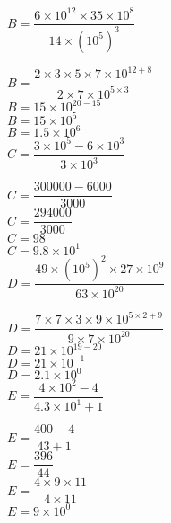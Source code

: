     \begin{spacing}{2}
        \begin{itemize}
            \def\item{}
            \item $B=\dfrac{6\times 10^{12}\times 35 \times 10^8}{14\times \left(10^5\right)^3}$

            {\red
                $B=\dfrac{2\times 3\times 5\times 7\times 10^{12+8}}{2\times 7\times 10^{5\times 3}}$\\
                $B=15\times 10^{20-15}$\\
                $B=15\times 10^{5}$\\
                $B=\num{1.5}\times 10^{6}$\\
            }
            \item $C=\dfrac{3\times 10^{5} - 6 \times 10^3}{3\times 10^3}$

            {\red
                $C=\dfrac{\num{300000} - \num{6000}}{\num{3000}}$\\
                $C=\dfrac{\num{294000}}{\num{3000}}$\\
                $C=98$\\
                $C=\num{9.8}\times 10^1$\\
            }
            \item $D=\dfrac{49\times (10^{5})^2\times 27 \times 10^9}{63\times 10^{20}}$

            {\red
                $D=\dfrac{7\times 7\times 3\times 9 \times 10^{5\times 2 + 9}}{9\times 7\times 10^{20}}$\\
                $D=21\times 10^{19-20}$\\
                $D=21\times 10^{-1}$\\
                $D=\num{2.1}\times 10^{0}$\\
            }
            \item $E=\dfrac{4\times 10^{2} -4}{\num{4.3}\times 10^1 + 1}$

            {\red
                $E=\dfrac{400 -4}{43 + 1}$\\
                $E=\dfrac{396}{44}$\\
                $E=\dfrac{4\times 9\times 11}{4\times 11}$\\
                $E=9\times 10^0$
            }
        \end{itemize}
    \end{spacing}
